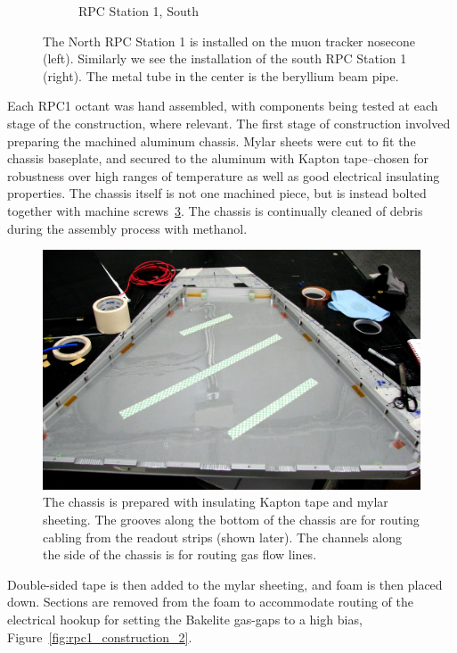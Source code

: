 \begin{figure}
\begin{subfigure}[b]{0.5\textwidth}
    \caption{RPC Station 1, South}
    \label{fig:rpc1s}
  \end{subfigure}
  \caption{
    The North RPC Station 1 is installed on the muon tracker nosecone (left).
    Similarly we see the installation of the south RPC Station 1 (right). The
    metal tube in the center is the beryllium beam pipe.
  }
  \label{fig:rpc1_installed}
\end{figure}

Each RPC1 octant was hand assembled, with components being tested at each stage
of the construction, where relevant. The first stage of construction involved
preparing the machined aluminum chassis. Mylar sheets were cut to fit the
chassis baseplate, and secured to the aluminum with Kapton tape--chosen for
robustness over high ranges of temperature as well as good electrical insulating
properties. The chassis itself is not one machined piece, but is instead bolted
together with machine screws~\ref{fig:rpc1_construction_1}. The chassis is
continually cleaned of debris during the assembly process with methanol.

\begin{figure}
  \centering
  \includegraphics[width=0.7\linewidth]{./figures/rpc1_construction_1}
  \caption{
    The chassis is prepared with insulating Kapton tape and mylar sheeting. The
    grooves along the bottom of the chassis are for routing cabling from the
    readout strips (shown later). The channels along the side of the chassis is
    for routing gas flow lines.
  }
  \label{fig:rpc1_construction_1}
\end{figure}

Double-sided tape is then added to the mylar sheeting, and foam is then
placed down. Sections are removed from the foam to accommodate routing of the
electrical hookup for setting the Bakelite gas-gaps to a high bias,
Figure~\ref{fig:rpc1_construction_2}.

